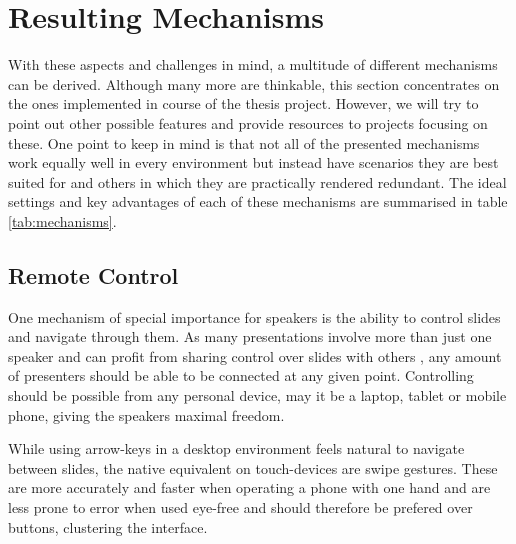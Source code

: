 \section{Resulting Mechanisms}
With these aspects and challenges in mind, a multitude of different mechanisms can be derived. Although many more are thinkable, this section concentrates on the ones implemented in course of the thesis project. However, we will try to point out other possible features and provide resources to projects focusing on these. One point to keep in mind is that not all of the presented mechanisms work equally well in every environment but instead have scenarios they are best suited for and others in which they are practically rendered redundant. The ideal settings and key advantages of each of these mechanisms are summarised in table \ref{tab:mechanisms}.

%

\subsection{Remote Control}
One mechanism of special importance for speakers is the ability to control slides and navigate through them. As many presentations involve more than just one speaker and can profit from sharing control over slides with others \cite{Chattopadhyay:OfficeSocialRemoteControl}, any amount of presenters should be able to be connected at any given point. Controlling should be possible from any personal device, may it be a laptop, tablet or mobile phone, giving the speakers maximal freedom.

While using arrow-keys in a desktop environment feels natural to navigate between slides, the native equivalent on touch-devices are swipe gestures. These are more accurately and faster when operating a phone with one hand \cite{Lai:SingleHandedThumbInteraction} and are less prone to error when used eye-free \cite{Negulescu:TapSwipeMove} and should therefore be prefered over buttons, clustering the interface.

